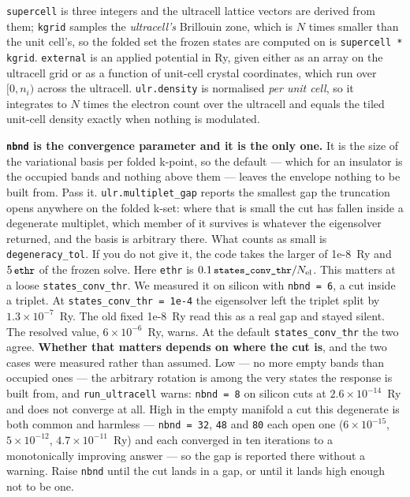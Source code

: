 \documentclass[11pt,a4paper]{article}
\newcommand{\code}[1]{\texttt{\small #1}}
\begin{document}
\code{supercell} is three integers and the ultracell lattice vectors are derived
from them; \code{kgrid} samples the \emph{ultracell's} Brillouin zone, which is
$N$ times smaller than the unit cell's, so the folded set the frozen states are
computed on is \code{supercell * kgrid}. \code{external} is an applied potential
in Ry, given either as an array on the ultracell grid or as a function of
unit-cell crystal coordinates, which run over $[0, n_i)$ across the ultracell.
\code{ulr.density} is normalised \emph{per unit cell}, so it integrates to $N$
times the electron count over the ultracell and equals the tiled unit-cell
density exactly when nothing is modulated.

\textbf{\code{nbnd} is the convergence parameter and it is the only one.} It is
the size of the variational basis per folded k-point, so the default --- which
for an insulator is the occupied bands and nothing above them --- leaves the
envelope nothing to be built from. Pass it. \code{ulr.multiplet\_gap} reports
the smallest gap the truncation opens anywhere on the folded k-set: where that
is small the cut has fallen inside a degenerate multiplet, which member of it
survives is whatever the eigensolver returned, and the basis is arbitrary
there. What counts as small is \code{degeneracy\_tol}. If you do not give it,
the code takes the larger of 1e-8~Ry and $5\,\code{ethr}$ of the frozen solve.
Here \code{ethr} is $0.1\,\code{states\_conv\_thr}/N_{\rm el}$. This matters
at a loose \code{states\_conv\_thr}. We measured it on silicon with
\code{nbnd = 6}, a cut inside a triplet. At \code{states\_conv\_thr = 1e-4} the
eigensolver left the triplet split by $1.3\times10^{-7}$~Ry. The old fixed
1e-8~Ry read this as a real gap and stayed silent. The resolved value,
$6\times10^{-6}$~Ry, warns. At the default \code{states\_conv\_thr} the two
agree. \textbf{Whether that matters depends on where the cut is}, and the two
cases were measured rather than assumed. Low --- no more empty bands than
occupied ones --- the arbitrary rotation is among the very states the response
is built from, and \code{run\_ultracell} warns: \code{nbnd = 8} on silicon cuts
at $2.6\times10^{-14}$~Ry and does not converge at all. High in the empty
manifold a cut this degenerate is both common and harmless --- \code{nbnd = 32},
\code{48} and \code{80} each open one ($6\times10^{-15}$, $5\times10^{-12}$,
$4.7\times10^{-11}$~Ry) and
each converged in ten iterations to a monotonically improving answer --- so the
gap is reported there without a warning. Raise \code{nbnd} until the cut lands
in a gap, or until it lands high enough not to be one.
\end{document}
